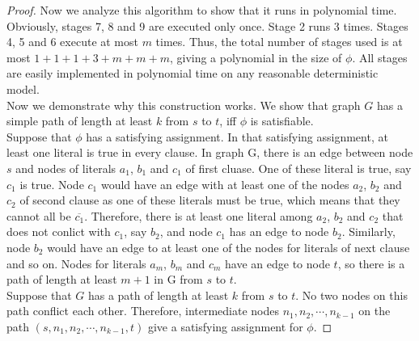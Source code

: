 \documentclass[11pt]{article}
\begin{document}
\begin{proof}
Now we analyze this algorithm to show that it runs in polynomial time. Obviously, stages 7, 8 and 9 are executed only once. Stage 2 runs 3 times. Stages 4, 5 and 6 execute at most $m$ times. Thus, the total number of stages used is at most $1 + 1 + 1 + 3 + m + m + m$, giving a polynomial in the size of $\phi$. All stages are easily implemented in polynomial time on any reasonable deterministic model. \\

Now we demonstrate why this construction works. We show that graph $G$ has a simple path of length at least $k$ from $s$ to $t$, iff $\phi$ is satisfiable. \\

Suppose that $\phi$ has a satisfying assignment. In that satisfying assignment, at
least one literal is true in every clause. In graph G, there is an edge between node $s$ and nodes of literals $a_1$, $b_1$ and $c_1$ of first cluase. One of these literal is true, say $c_1$ is true. Node $c_1$ would have an edge with at least one of the nodes $a_2$, $b_2$ and $c_2$ of second clause as one of these literals must be true, which means that they cannot all be $\overline{c_1}$. Therefore, there is at least one literal among $a_2$, $b_2$ and $c_2$ that does not conlict with $c_1$, say $b_2$, and node $c_1$ has an edge to node $b_2$. Similarly, node $b_2$ would have an edge to at least one of the nodes for literals of next clause and so on. Nodes for literals $a_m$, $b_m$ and $c_m$ have an edge to node $t$, so there is a path of length at least $m+1$ in G from $s$ to $t$. \\

Suppose that $G$ has a path of length at least $k$ from $s$ to $t$. No two nodes on this path conflict each other. Therefore, intermediate nodes $n_1, n_2, \cdots, n_{k-1}$ on the path $(s,n_1,n_2, \cdots,n_{k-1}, t)$ give a satisfying assignment for $\phi$.


\end{proof}
\end{document}
